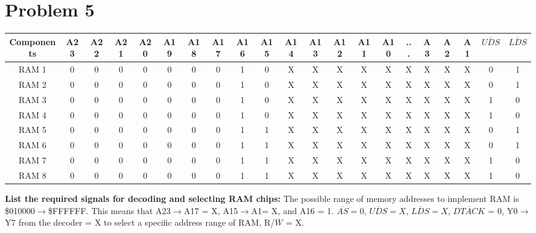 \documentclass[12pt]{article}
\begin{document}
\section*{Problem 5}
\begin{adjustbox}{max width = \linewidth}

\begin{tabulary}{\linewidth}{|c|c c c c|c c c c|c c c c|c c c c c c| c c|}
	\hline
	Components	&	A23 & A22 & A21 & A20	&	A19 & A18 & A17 & A16 & A15 & A14 & A13 & A12 & A11 & A10 & ... & A3 & A2 & A1 & $\overline{UDS}$ & $\overline{LDS}$ \\ \hline \hline
	
	RAM 1	&	0 & 0 & 0 & 0	&	0 & 0 & 0 & 1 & 0 & X & X & X & X & X & X & X & X & X & 0 & 1 \\ \hline
	
	RAM 2	&	0 & 0 & 0 & 0	&	0 & 0 & 0 & 1 & 0 & X & X & X & X & X & X & X & X & X & 0 & 1 \\ \hline
	
	RAM 3	&	0 & 0 & 0 & 0	&	0 & 0 & 0 & 1 & 0 & X & X & X & X & X & X & X & X & X & 1 & 0 \\ \hline
	
	RAM 4	&	0 & 0 & 0 & 0	&	0 & 0 & 0 & 1 & 0 & X & X & X & X & X & X & X & X & X & 1 & 0 \\ \hline
	
	RAM 5	&	0 & 0 & 0 & 0	&	0 & 0 & 0 & 1 & 1 & X & X & X & X & X & X & X & X & X & 0 & 1 \\ \hline
	
	RAM 6	&	0 & 0 & 0 & 0	&	0 & 0 & 0 & 1 & 1 & X & X & X & X & X & X & X & X & X & 0 & 1 \\ \hline
	
	RAM 7	&	0 & 0 & 0 & 0	&	0 & 0 & 0 & 1 & 1 & X & X & X & X & X & X & X & X & X & 1 & 0 \\ \hline
	
	RAM 8	&	0 & 0 & 0 & 0	&	0 & 0 & 0 & 1 & 1 & X & X & X & X & X & X & X & X & X & 1 & 0 \\ \hline 
\end{tabulary}
\end{adjustbox}

\vspace{0.5in}
\noindent \textbf{List the required signals for decoding and selecting RAM chips: } The possible range of memory addresses to implement RAM is \$010000$\to$\$FFFFFF. This means that A23$\to$A17 = X, A15$\to$A1= X, and A16 = 1. $\overline{AS} = 0$, $\overline{UDS} = X$, $\overline{LDS} = X$, $\overline{DTACK}$ = 0, Y0$\to$Y7 from the decoder = X to select a specific address range of RAM, R/$\overline{W}$ = X.
\end{document}
